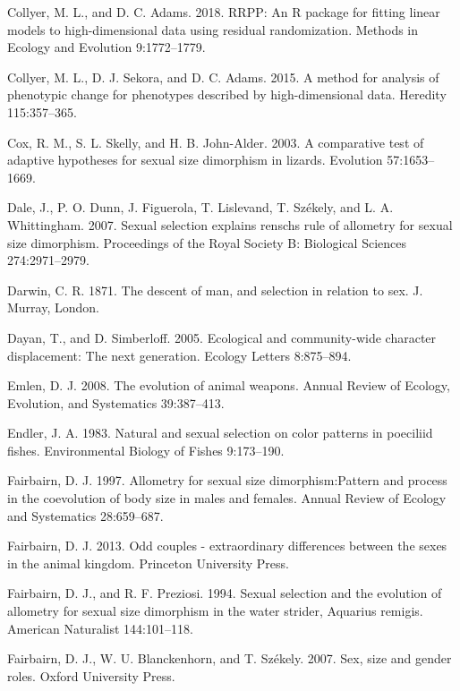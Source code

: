 \documentclass[]{article}
\begin{document}
\hypertarget{ref-CollyerAdams2018}{}
Collyer, M. L., and D. C. Adams. 2018. RRPP: An R package for fitting
linear models to high-dimensional data using residual randomization.
Methods in Ecology and Evolution 9:1772--1779.

\hypertarget{ref-Collyer_et_al2015a}{}
Collyer, M. L., D. J. Sekora, and D. C. Adams. 2015. A method for
analysis of phenotypic change for phenotypes described by
high-dimensional data. Heredity 115:357--365.

\hypertarget{ref-Cox2003}{}
Cox, R. M., S. L. Skelly, and H. B. John-Alder. 2003. A comparative test
of adaptive hypotheses for sexual size dimorphism in lizards. Evolution
57:1653--1669.

\hypertarget{ref-Dale2007}{}
Dale, J., P. O. Dunn, J. Figuerola, T. Lislevand, T. Székely, and L. A.
Whittingham. 2007. Sexual selection explains renschs rule of allometry
for sexual size dimorphism. Proceedings of the Royal Society B:
Biological Sciences 274:2971--2979.

\hypertarget{ref-Darwin1871}{}
Darwin, C. R. 1871. The descent of man, and selection in relation to
sex. J. Murray, London.

\hypertarget{ref-DayanSimberloff2005}{}
Dayan, T., and D. Simberloff. 2005. Ecological and community-wide
character displacement: The next generation. Ecology Letters 8:875--894.

\hypertarget{ref-Emlen2008}{}
Emlen, D. J. 2008. The evolution of animal weapons. Annual Review of
Ecology, Evolution, and Systematics 39:387--413.

\hypertarget{ref-Endler1983}{}
Endler, J. A. 1983. Natural and sexual selection on color patterns in
poeciliid fishes. Environmental Biology of Fishes 9:173--190.

\hypertarget{ref-Fairbairn1997}{}
Fairbairn, D. J. 1997. Allometry for sexual size dimorphism:Pattern and
process in the coevolution of body size in males and females. Annual
Review of Ecology and Systematics 28:659--687.

\hypertarget{ref-Fairbairn2013}{}
Fairbairn, D. J. 2013. Odd couples - extraordinary differences between
the sexes in the animal kingdom. Princeton University Press.

\hypertarget{ref-Fairbairn1994}{}
Fairbairn, D. J., and R. F. Preziosi. 1994. Sexual selection and the
evolution of allometry for sexual size dimorphism in the water strider,
Aquarius remigis. American Naturalist 144:101--118.

\hypertarget{ref-Fairbairn2007}{}
Fairbairn, D. J., W. U. Blanckenhorn, and T. Székely. 2007. Sex, size
and gender roles. Oxford University Press.
\end{document}
